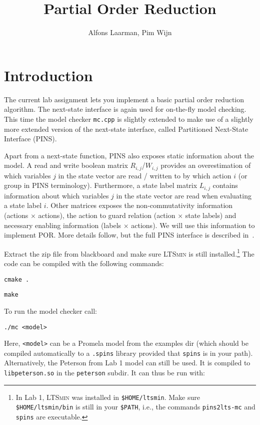 \documentclass[12pt]{article}
\title{Partial Order Reduction}
\author{{Alfons Laarman, Pim Wijn}}
\def\ltsmin{\textsc{LTSmin}\xspace}
\begin{document}
\maketitle

\section{Introduction}

The current lab assignment lets you implement a basic
partial order reduction algorithm. 
The next-state interface is again used for
on-the-fly model checking. 
This time the model checker \texttt{mc.cpp}
is slightly extended to make use of a slightly more
extended version of the next-state interface, called
Partitioned Next-State Interface (PINS).

Apart from a next-state function, PINS also exposes
static information about the model.
A read and write boolean matrix $R_{i,j}$/$W_{i,j}$
provides an overestimation
of which variables $j$ in the state vector are read / 
written to by which action $i$ (or group in PINS terminology).
Furthermore, a state label matrix $L_{i,j}$ contains information
about which variables $j$ in the state vector are read
when evaluating a state label $i$.
Other matrices exposes the non-commutativity information
(actions $\times$ actions), the action to guard relation 
(action $\times$ state labels) and 
necessary enabling information (labels $\times$ actions).
We will use this information to implement POR.
More details follow, but the full PINS interface is described in~\cite{ltsmin2}.


Extract the zip file from blackboard and make 
sure \ltsmin is still installed.\footnote{In Lab 1,
\ltsmin was installed in \texttt{\$HOME/ltsmin}.
Make sure \texttt{\$HOME/ltsmin/bin} is still in your
\texttt{\$PATH}, i.e., the commands \texttt{pins2lts-mc} and \texttt{spins} are executable.}
The code can be compiled with the following commands:

\texttt{cmake .}

\texttt{make}


To run the model checker call:

\texttt{./mc <model>}

Here, \texttt{<model>} can be a Promela model
from the examples dir (which should be compiled
automatically to a \texttt{.spins} library
provided that \texttt{spins} is in your path).
Alternatively, the Peterson from Lab 1 model can 
still be used. It is compiled to \texttt{libpeterson.so}
in the \texttt{peterson} subdir. It can thus be run with:
\end{document}
